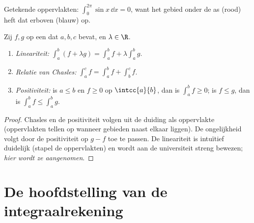 \begin{omfigure}

{\small Getekende oppervlakten: $\int_0^{2\pi} \sin x\,\dd x = 0$, want het
gebied onder de as (rood) heft dat erboven (blauw) op.}
\end{omfigure}

\begin{proposition}\label{prop:g12:integ:properties}
Zij $f, g$  op een  dat $a, b, c$ bevat, en $\lambda \in \R$.
\begin{enumerate}
  \item \emph{Lineariteit:}
        $\displaystyle\int_a^b (f + \lambda g) = \int_a^b f + \lambda \int_a^b g$.
  \item \emph{Relatie van Chasles:}
        $\displaystyle\int_a^c f = \int_a^b f + \int_b^c f$.
  \item \emph{Positiviteit:} is $a \leq b$ en $f \geq 0$ op $\intcc{a}{b}$,
        dan is $\displaystyle\int_a^b f \geq 0$; is $f \leq g$, dan is
        $\displaystyle\int_a^b f \leq \int_a^b g$.
\end{enumerate}
\end{proposition}

\begin{proof}
Chasles en de positiviteit volgen uit de duiding als oppervlakte (oppervlakten
tellen op wanneer gebieden naast elkaar liggen). De ongelijkheid volgt door de
positiviteit op $g - f$ toe te passen. De lineariteit is intuïtief duidelijk
(stapel de oppervlakten) en wordt aan de universiteit streng bewezen;
\emph{hier wordt ze aangenomen}.
\end{proof}

\section{De hoofdstelling van de integraalrekening}

